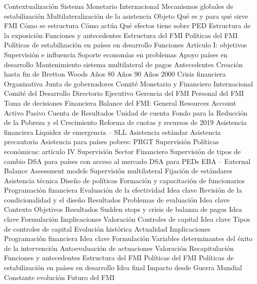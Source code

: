 \documentclass{nuevotema}
\begin{document}
\begin{esquema}[enumerate]
	\1[] 
		\2 Contextualización
			\3 Sistema Monetario Internacional
			\3 Mecanismos globales de estabilización
			\3 Multilateralización de la asistencia
		\2 Objeto
			\3 Qué es y para qué sirve FMI
			\3 Cómo se estructura
			\3 Cómo actúa
			\3 Qué efectos tiene sobre PED
		\2 Estructura de la exposición
			\3 Funciones y antecedentes
			\3 Estructura del FMI
			\3 Políticas del FMI
			\3 Políticas de estabilización en países en desarrollo
	\1 
		\2 Funciones
			\3 Artículo I: objetivos
			\3 Supervisión e influencia
			\3 Soporte economías en problemas
			\3 Apoyo países en desarrollo
			\3 Mantenimiento sistema multilateral de pagos
		\2 Antecedentes
			\3 Creación hasta fin de Bretton Woods
			\3 Años 80
			\3 Años 90
			\3 Años 2000
			\3 Crisis financiera
	\1 
		\2 Organizativa
			\3 Junta de gobernadores
			\3 Comité Monetario y Financiero Internacional
			\3 Comité del Desarrollo
			\3 Directorio Ejecutivo
			\3 Gerencia del FMI
			\3 Personal del FMI
			\3 Toma de decisiones
		\2 Financiera
			\3 Balance del FMI: General Resources Account
			\3 Activo
			\3 Pasivo
			\3 Cuenta de Resultados
			\3 Unidad de cuenta
			\3 Fondo para la Reducción de la Pobreza y el Crecimiento
			\3 Reforma de cuotas y recursos de 2019
	\1 
		\2 Asistencia financiera
			\3 Liquidez de emergencia -- SLL
			\3 Asistencia estándar
			\3 Asistencia precautoria
			\3 Asistencia para países pobres: PRGT
		\2 Supervisión
			\3 Políticas económicas: artículo IV
			\3 Supervisión Sector Financiero
			\3 Supervisión de tipos de cambio
			\3 DSA para países con acceso al mercado
			\3 DSA para PEDs
			\3 EBA -- External Balance Assessment models
			\3 Supervisión multilateral
			\3 Fijación de estándares
		\2 Asistencia técnica
			\3 Diseño de políticas
			\3 Formación y capacitación de funcionarios
			\3 Programación financiera
		\2 Evaluación de la efectividad
			\3 Idea clave
			\3 Revisión de la condicionalidad y el diseño
			\3 Resultados
			\3 Problemas de evaluación
	\1 
		\2 Idea clave
			\3 Contexto
			\3 Objetivos
			\3 Resultados
		\2 Sudden stops y crisis de balanza de pagos
			\3 Idea clave
			\3 Formulación
			\3 Implicaciones
			\3 Valoración
		\2 Controles de capital
			\3 Idea clave
			\3 Tipos de controles de capital
			\3 Evolución histórica
			\3 Actualidad
			\3 Implicaciones
		\2 Programación financiera
			\3 Idea clave
			\3 Formulación
			\3 Variables determinantes del éxito de la intervención
			\3 Autoevaluación de actuaciones
			\3 Valoración
	\1[] 
		\2 Recapitulación
			\3 Funciones y antecedentes
			\3 Estructura del FMI
			\3 Políticas del FMI
			\3 Políticas de estabilización en países en desarrollo
		\2 Idea final
			\3 Impacto desde Guerra Mundial
			\3 Constante evolución
			\3 Futuro del FMI

\end{esquema}
\end{document}
